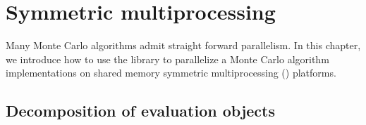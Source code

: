 %
%
%
%

\chapter{Symmetric multiprocessing}
\label{chap:Symmetric multiprocessing}

Many Monte Carlo algorithms admit straight forward parallelism. In this
chapter, we introduce how to use the library to parallelize a Monte Carlo
algorithm implementations on shared memory symmetric multiprocessing (\smp)
platforms.

\section{Decomposition of evaluation objects}
\label{sec:Decomposition of evaluation objects}

